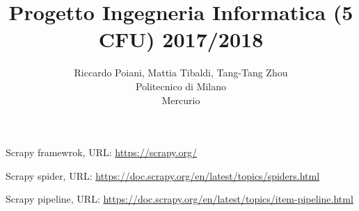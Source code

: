 \documentclass[a4paper]{article}
\begin{document}
\title{Progetto Ingegneria Informatica (5 CFU) 2017/2018}
\author{
        Riccardo Poiani, Mattia Tibaldi, Tang-Tang Zhou \\
        Politecnico di Milano\\  
        Mercurio              
}
\maketitle
\newpage
\tableofcontents
\newpage




\begin{thebibliography}{9}
Scrapy framewrok, URL: \url{https://scrapy.org/}

Scrapy spider, URL: \url{https://doc.scrapy.org/en/latest/topics/spiders.html}

Scrapy pipeline, URL: \url{https://doc.scrapy.org/en/latest/topics/item-pipeline.html}

\end{thebibliography}
\end{document}
